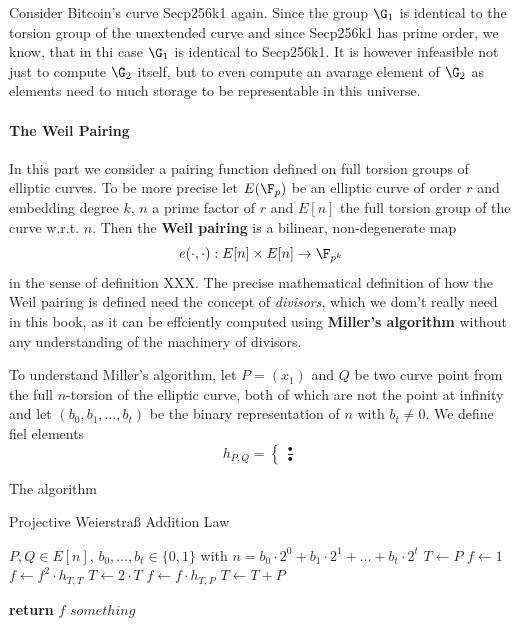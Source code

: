 \begin{example}Consider Bitcoin's curve Secp256k1 again. Since the group $\G_1$ is identical to the torsion group of the unextended curve and since Secp256k1 has prime order, we know, that in thi case $\G_1$ is identical to Secp256k1. It is however infeasible not just to compute $\G_2$ itself, but to even compute an avarage element of $\G_2$ as elements need to much storage to be representable in this universe.
\end{example}
\paragraph{The Weil Pairing} In this part we consider a pairing function defined on
full torsion groups of elliptic curves. To be more precise let $E(\F_p)$ be an elliptic curve of order $r$ and embedding degree $k$, $n$ a prime factor of $r$ and $E[n]$ the full torsion group of the curve w.r.t. $n$. Then the \textbf{Weil pairing} is a bilinear, non-degenerate map
\begin{equation}
e(\cdot,\cdot) : E[n] \times E[n] \to \F_{p^k}
\end{equation} 
in the sense of definition XXX. The precise mathematical definition of how the Weil pairing is defined need the concept of \textit{divisors}, which we dom't really need in this book, as it can be effciently computed using \textbf{Miller's algorithm} without any understanding of the machinery of divisors.

To understand Miller's algorithm, let $P=(x_1)$ and $Q$ be two curve point from the full $n$-torsion of the elliptic curve, both of which are not the point at infinity and let $(b_0,b_1,\ldots,b_t)$ be the binary representation of $n$ with $b_t\neq 0$.
We define fiel elements
\begin{equation}
h_{P,Q} = 
\begin{cases}
\frac{•}{•}
\end{cases}
\end{equation}

 The algorithm  
\begin{algorithm}\caption{Projective Weierstraß Addition Law}
\label{alg_projective_group_law}
\begin{algorithmic}[0]
\Require $P,Q \in E[n]$, $b_0,\ldots, b_t\in \{0,1\}$ with
$n= b_0\cdot 2^0 + b_1\cdot 2^1 + \ldots + b_t\cdot 2^t$
\State $T \gets P$
\State $f\gets 1$
	\State $f\gets f^2\cdot h_{T,T}$
	\State $T\gets 2\cdot T$
		\State $f \gets f\cdot h_{T,P}$
		\State $T \gets T + P$
	\EndIf
\EndFor

\State \textbf{return} $f$
\EndProcedure
\Ensure $ something$
\end{algorithmic}
\end{algorithm}


